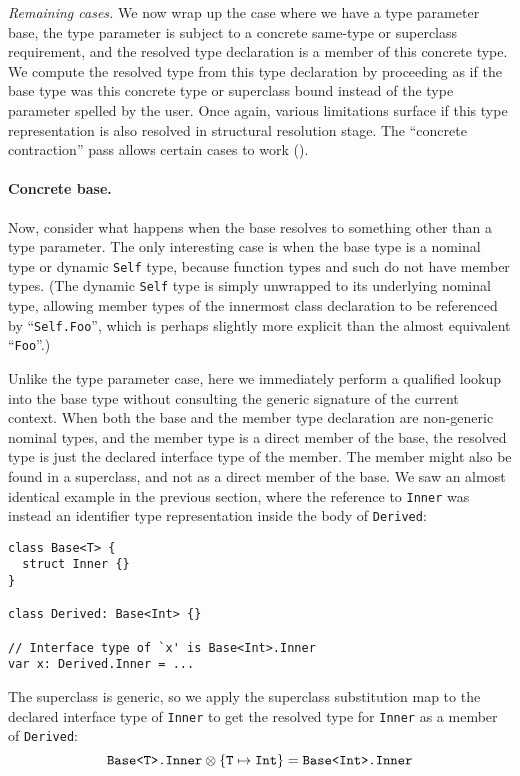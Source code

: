 \documentclass[../generics]{subfiles}
\begin{document}
\smallskip

\emph{Remaining cases.} We now wrap up the case where we have a type parameter base, the type parameter is subject to a concrete same-type or superclass requirement, and the resolved type declaration is a member of this concrete type. We compute the resolved type from this type declaration by proceeding as if the base type was this concrete type or superclass bound instead of the type parameter spelled by the user. Once again, various limitations surface if this type representation is also resolved in structural resolution stage. The ``concrete contraction'' pass allows certain cases to work ().

\paragraph{Concrete base.} Now, consider what happens when the base resolves to something other than a type parameter. The only interesting case is when the base type is a nominal type or dynamic \texttt{Self} type, because function types and such do not have member types. (The dynamic \texttt{Self} type is simply unwrapped to its underlying nominal type, allowing member types of the innermost class declaration to be referenced by ``\texttt{Self.Foo}'', which is perhaps slightly more explicit than the almost equivalent ``\texttt{Foo}''.)

Unlike the type parameter case, here we immediately perform a qualified lookup into the base type without consulting the generic signature of the current context. When both the base and the member type declaration are non-generic nominal types, and the member type is a direct member of the base, the resolved type is just the declared interface type of the member. The member might also be found in a superclass, and not as a direct member of the base. We saw an almost identical example in the previous section, where the reference to \texttt{Inner} was instead an identifier type representation inside the body of \texttt{Derived}:
\begin{Verbatim}
class Base<T> {
  struct Inner {}
}

class Derived: Base<Int> {}

// Interface type of `x' is Base<Int>.Inner
var x: Derived.Inner = ...
\end{Verbatim}
The superclass is generic, so we apply the superclass substitution map to the declared interface type of \texttt{Inner} to get the resolved type for \texttt{Inner} as a member of \texttt{Derived}:
\[\texttt{Base<T>.Inner}\otimes\{\texttt{T} \mapsto \texttt{Int}\}=\texttt{Base<Int>.Inner}\]
\end{document}
